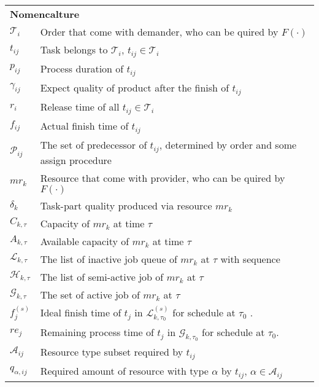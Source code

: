 \begin{table}[htbp]
  \scriptsize
\begin{tabularx}{\textwidth}{|lX|}
    \hline
    \multicolumn{2}{|l|}{\multirow{2}[0]{*}{\textbf{Nomencalture}}} \\
    \multicolumn{2}{|l|}{} \\
	$\mathcal{T}_i$ & Order that come with demander, who can be quired by $F(\cdot)$ \\
	$t_{ij}$ & Task belongs to $\mathcal{T}_i$, $t_{ij}\in\mathcal{T}_i$ \\
	$p_{ij}$ & Process duration of $t_{ij}$\\
	$\gamma_{ij}$ & Expect quality of product after the finish of $t_{ij}$\\
	$r_i$ & Release time of all $t_{ij}\in\mathcal{T}_i$\\
	$f_{ij}$ & Actual finish time of $t_{ij}$ \\
	$\mathcal{P}_{ij}$ & The set of predecessor of $t_{ij}$, determined by order and some assign procedure\\
	$mr_k$ & Resource that come with provider, who can be quired by $F(\cdot)$ \\
	$\delta_k$ & Task-part quality produced via resource $mr_k$ \\
	$C_{k,\tau}$ & Capacity of $mr_k$ at time $\tau$\\
	$A_{k,\tau}$ & Available capacity of $mr_k$ at time $\tau$\\
	$\mathcal{L}_{k,\tau}$ & The list of inactive job queue of $mr_k$ at $\tau$ with sequence\\
	$\mathcal{H}_{k,\tau}$ & The list of semi-active job of $mr_k$ at $\tau$ \\
	$\mathcal{G}_{k,\tau}$ & The set of active job of $mr_k$ at $\tau$ \\ 
	$f^{(s)}_j$ & Ideal finish time of $t_j$ in $\mathcal{L}^{(s)}_{k,\tau_0}$ for schedule at $\tau_0$ . \\
	$re_j$ & Remaining process time of $t_j$ in $\mathcal{G}_{k,\tau_0}$ for schedule at $\tau_0$. \\
	$\mathcal{A}_{ij}$ & Resource type subset required by $t_{ij}$\\ %
	$q_{\alpha,ij}$ & Required amount of resource with type $\alpha$ by $t_{ij}$, $\alpha\in\mathcal{A}_{ij}$\\

\end{tabularx}
\end{table}
